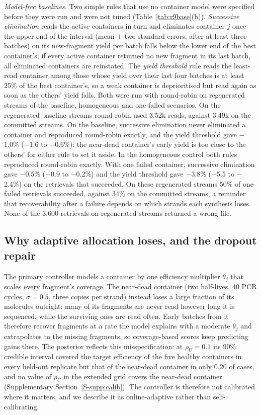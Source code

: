 \documentclass[conference,onecolumn,11pt]{IEEEtran}
\begin{document}
\emph{Model-free baselines.}\label{sec:res-extra}  Two simple rules that use no container model were
specified before they were run and were not tuned (Table~\ref{tab:r9base}(b)).  \emph{Successive
elimination} reads the active containers in turn and eliminates container $j$ once the upper end of the
interval (mean $\pm$ two standard errors, after at least three batches) on its new-fragment yield per
batch falls below the lower end of the best container's; if every active container returned no new
fragment in its last batch, all eliminated containers are reinstated.  The \emph{yield threshold} rule
reads the least-read container among those whose yield over their last four batches is at least 25\% of
the best container's, so a weak container is deprioritised but read again as soon as the others' yield
falls.  Both were run with round-robin on regenerated streams of the baseline, homogeneous and
one-failed scenarios.  On the regenerated baseline streams round-robin used 3.52k reads, against 3.49k on the committed streams.  On the baseline, successive elimination never eliminated a container and reproduced round-robin exactly, and the yield threshold gave $-$1.0\% ($-$1.6 to $-$0.6\%): the near-dead container's early yield is too close to the others' for either rule to set it aside.  In the homogeneous control both rules reproduced round-robin exactly.  With one failed container, successive elimination gave $-$0.5\% ($-$0.9 to $-$0.2\%) and the yield threshold gave $-$3.8\% ($-$5.5 to $-$2.4\%) on the retrievals that succeeded.  On these regenerated streams 50\% of one-failed retrievals succeeded, against 34\% on the committed streams, a reminder that recoverability after a failure depends on which strands each synthesis loses.  None of the 3{,}600 retrievals on regenerated streams returned a wrong file.

\subsection{Why adaptive allocation loses, and the dropout repair}\label{sec:res-misspec}\label{sec:res-dropout}\label{sec:res-calib}
The primary controller models a container by one efficiency multiplier $\theta_j$ that scales every
fragment's coverage.  The near-dead container (two half-lives, 40 PCR cycles, $\sigma{=}0.5$, three
copies per strand) instead loses a large fraction of its molecules outright: many of its fragments are
never read however long it is sequenced, while the surviving ones are read often.  Early batches from it
therefore recover fragments at a rate the model explains with a moderate $\theta_j$ and extrapolates to
the missing fragments, so coverage-based scores keep predicting gains there.  The posterior reflects
this misspecification: at $\rho_U{=}0.1$ its 90\% credible interval covered the target efficiency of the
five healthy containers in every held-out replicate but that of the near-dead container in only 0.20 of
cases, and no value of $\rho_U$ in the extended grid covers the near-dead container
(Supplementary Section~\ref{S-supp:calib}).  The controller is therefore not calibrated where it matters,
and we describe it as online-adaptive rather than self-calibrating.
\end{document}
